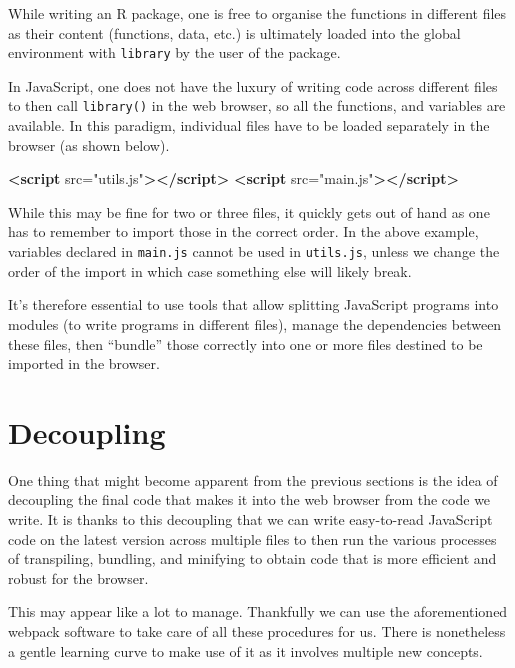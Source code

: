 \documentclass[10pt,]{krantz}
\makeatletter
\newenvironment{Shaded}{\begin{snugshade}}{\end{snugshade}}
\newcommand{\KeywordTok}[1]{\textcolor[rgb]{0.27,0.27,0.27}{\textbf{#1}}}
\newcommand{\OtherTok}[1]{\textcolor[rgb]{0.37,0.37,0.37}{#1}}
\newcommand{\StringTok}[1]{\textcolor[rgb]{0.5,0.5,0.5}{#1}}
\newenvironment{kframe}{%
\medskip{}
\setlength{\fboxsep}{.8em}
 \def\at@end@of@kframe{}%
 \ifinner\ifhmode%
  \def\at@end@of@kframe{\end{minipage}}%
  \begin{minipage}{\columnwidth}%
 \fi\fi%
 \def\FrameCommand##1{\hskip\@totalleftmargin \hskip-\fboxsep
 \colorbox{shadecolor}{##1}\hskip-\fboxsep
     \hskip-\linewidth \hskip-\@totalleftmargin \hskip\columnwidth}%
 \MakeFramed {\advance\hsize-\width
   \@totalleftmargin\z@ \linewidth\hsize
   \@setminipage}}%
 {\par\unskip\endMakeFramed%
 \at@end@of@kframe}
\renewenvironment{Shaded}{\begin{kframe}}{\end{kframe}}
\makeatother
\begin{document}
While writing an R package, one is free to organise the functions in different files as their content (functions, data, etc.) is ultimately loaded into the global environment with \texttt{library} by the user of the package.

In JavaScript, one does not have the luxury of writing code across different files to then call \texttt{library()} in the web browser, so all the functions, and variables are available. In this paradigm, individual files have to be loaded separately in the browser (as shown below).

\begin{Shaded}
\begin{Highlighting}[]
\KeywordTok{<script}\OtherTok{ src=}\StringTok{"utils.js"}\KeywordTok{></script>}
\KeywordTok{<script}\OtherTok{ src=}\StringTok{"main.js"}\KeywordTok{></script>}
\end{Highlighting}
\end{Shaded}

While this may be fine for two or three files, it quickly gets out of hand as one has to remember to import those in the correct order. In the above example, variables declared in \texttt{main.js} cannot be used in \texttt{utils.js}, unless we change the order of the import in which case something else will likely break.

It's therefore essential to use tools that allow splitting JavaScript programs into modules (to write programs in different files), manage the dependencies between these files, then ``bundle'' those correctly into one or more files destined to be imported in the browser.

\hypertarget{webpack-decouple}{%
\section{Decoupling}\label{webpack-decouple}}

One thing that might become apparent from the previous sections is the idea of decoupling the final code that makes it into the web browser from the code we write. It is thanks to this decoupling that we can write easy-to-read JavaScript code on the latest version across multiple files to then run the various processes of transpiling, bundling, and minifying to obtain code that is more efficient and robust for the browser.

This may appear like a lot to manage. Thankfully we can use the aforementioned webpack software to take care of all these procedures for us. There is nonetheless a gentle learning curve to make use of it as it involves multiple new concepts.
\end{document}
